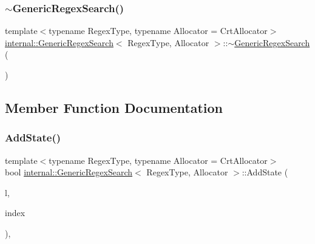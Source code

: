 \mbox{\label{classinternal_1_1GenericRegexSearch_ad14ee51edf6f9bfe3b7cffa59c4c19c9}} 
\subsubsection{\texorpdfstring{$\sim$\+Generic\+Regex\+Search()}{~GenericRegexSearch()}}
{\footnotesize\ttfamily template$<$typename Regex\+Type, typename Allocator = Crt\+Allocator$>$ \\
\hyperlink{classinternal_1_1GenericRegexSearch}{internal\+::\+Generic\+Regex\+Search}$<$ Regex\+Type, Allocator $>$\+::$\sim$\hyperlink{classinternal_1_1GenericRegexSearch}{Generic\+Regex\+Search} (\begin{DoxyParamCaption}{ }\end{DoxyParamCaption})\hspace{0.3cm}{\ttfamily [inline]}}



\subsection{Member Function Documentation}
\mbox{\label{classinternal_1_1GenericRegexSearch_aa16ed718784de143ec64861b2b662ea4}} 
\subsubsection{\texorpdfstring{Add\+State()}{AddState()}}
{\footnotesize\ttfamily template$<$typename Regex\+Type, typename Allocator = Crt\+Allocator$>$ \\
bool \hyperlink{classinternal_1_1GenericRegexSearch}{internal\+::\+Generic\+Regex\+Search}$<$ Regex\+Type, Allocator $>$\+::Add\+State (\begin{DoxyParamCaption}\item[{\hyperlink{classinternal_1_1Stack}{Stack}$<$ Allocator $>$ \&}]{l,  }\item[{\hyperlink{rapidjson_8h_a5ed6e6e67250fadbd041127e6386dcb5}{Size\+Type}}]{index }\end{DoxyParamCaption})\hspace{0.3cm}{\ttfamily [inline]}, {\ttfamily [private]}}

